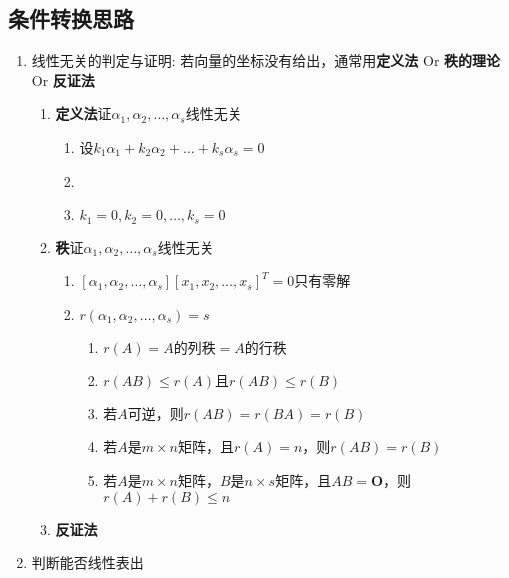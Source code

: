 \documentclass[a4paper,12pt]{article}
\begin{document}
    \subsection{条件转换思路}

    \begin{enumerate}
        \item 线性无关的判定与证明:\; 若向量的坐标没有给出，通常用\textbf{定义法} Or \textbf{秩的理论} Or \textbf{反证法}
        \begin{enumerate}
            \item \textbf{定义法}证$\alpha_1, \alpha_2, \dots, \alpha_s$线性无关
            \begin{enumerate}
                \item 设$k_{1}\alpha_1 + k_{2}\alpha_2 + \dots + k_{s}\alpha_s = 0$
                \item \Downarrow {}
                \item $k_1 = 0, k_2 = 0, \dots, k_s = 0$
            \end{enumerate}
            \item \textbf{秩}证$\alpha_1, \alpha_2, \dots, \alpha_s$线性无关
            \begin{enumerate}
                \item \Leftrightarrow $[\alpha_1, \alpha_2, \dots, \alpha_s][x_1, x_2, \dots, x_s]^T = 0$只有零解
                \item \Leftrightarrow {}$r(\alpha_1, \alpha_2, \dots, \alpha_s) = s$
                \begin{enumerate}
                    \item $r(A) = A\text{的列秩} = A\text{的行秩}$
                    \item $r(AB) \le r(A) \text{且} r(AB) \le r(B)$
                    \item 若$A$可逆，则$r(AB) = r(BA) = r(B)$
                    \item 若$A$是$m \times n$矩阵，且$r(A) = n$，则$r(AB) = r(B)$
                    \item 若$A$是$m \times n$矩阵，$B$是$n \times s$矩阵，且$AB = \mathbf{O}$，则$r(A) + r(B) \le n$
                \end{enumerate}
            \end{enumerate}
            \item \textbf{反证法}
        \end{enumerate}
        \item 判断能否线性表出

\end{enumerate}
\end{document}
